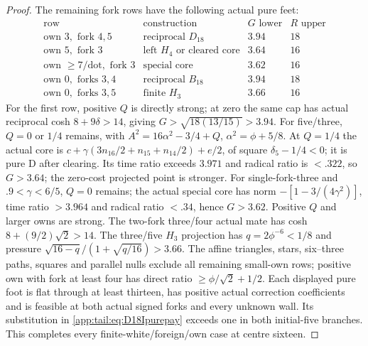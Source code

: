 \begin{proof}
The remaining fork rows have the following actual pure feet:
\[
\begin{array}{c|c|cc}
\text{row}&\text{construction}&G\text{ lower}&R\text{ upper}\\\hline
\text{own }3,\text{ fork }4,5&\text{reciprocal }D_{18}&3.94&18\\
\text{own }5,\text{ fork }3&\text{left }H_4\text{ or cleared core}&3.64&16\\
\text{own }\ge7/\text{dot},\text{ fork }3&\text{special core}&3.62&16\\
\text{own }0,\text{ forks }3,4&\text{reciprocal }B_{18}&3.94&18\\
\text{own }0,\text{ forks }3,5&\text{finite }H_3&3.66&16
\end{array}
\]
For the first row, positive $Q$ is directly strong; at zero
the same cap has actual reciprocal cosh $8+9\delta>14$,
giving $G>\sqrt{18(13/15)}>3.94$.
For five/three, $Q=0$ or $1/4$ remains, with
$A^2=16\alpha^2-3/4+Q$, $\alpha^2=\phi+5/8$.
At $Q=1/4$ the actual core is
$c+\gamma(3n_{16}/2+n_{15}+n_{14}/2)+e/2$,
of square $\delta_5-1/4<0$; it is pure D after clearing.
Its time ratio exceeds $3.971$ and radical ratio is $<.322$,
so $G>3.64$; the zero-cost projected point is stronger.
For single-fork-three and $.9<\gamma<6/5$, $Q=0$ remains;
the actual special core has norm $-[1-3/(4\gamma^2)]$,
time ratio $>3.964$ and radical ratio $<.34$, hence $G>3.62$.
Positive $Q$ and larger owns are strong.
The two-fork three/four actual mate has cosh
$8+(9/2)\sqrt2>14$. The three/five $H_3$ projection has
$q=2\phi^{-6}<1/8$ and pressure
$\sqrt{16-q}/(1+\sqrt{q/16})>3.66$.
The affine triangles, stars, six--three paths, squares and
parallel nulls exclude all remaining small-own rows; positive
own with fork at least four has direct ratio
$\ge\phi/\sqrt2+1/2$.
Each displayed pure foot is flat through at least thirteen,
has positive actual correction coefficients and is feasible
at both actual signed forks and every unknown wall.
Its substitution in \eqref{app:tail:eq:D18Ipurepay} exceeds
one in both initial-five branches. This completes every
finite-white/foreign/own case at centre sixteen.


\end{proof}
